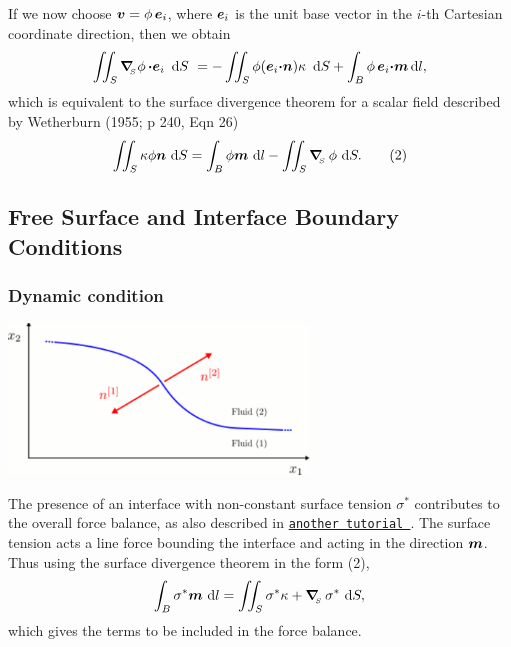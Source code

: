 If we now choose $ \mbox{\boldmath$v$} = \phi\, \mbox{\boldmath$e$}_{i}$, where $ \mbox{\boldmath$e$}_{i}$ is the unit base vector in the $ i\!$-\/th Cartesian coordinate direction, then we obtain \[\int\!\!\!\int_{S} \mbox{\boldmath$\nabla$}_{\!\!_S} \phi\, \mbox{\boldmath$\cdot e$}_{i}\,\mbox{ d}S\ = - \int\!\!\!\int_{S} \phi (\mbox{\boldmath$e$}_{i} \mbox{\boldmath$\cdot n$}) \kappa\,\mbox{ d}S + \int_{B} \phi\, \mbox{\boldmath$e$}_{i} \mbox{\boldmath$\cdot m$}\,\mbox{d} l, \] which is equivalent to the surface divergence theorem for a scalar field described by Wetherburn (1955; p 240, Eqn 26) \[ \int\!\!\!\int_{S} \kappa \phi \mbox{\boldmath$n$}\mbox{ d}S = \int_{B} \phi \mbox{\boldmath$m$} \mbox{ d} l - \int\!\!\!\int_{S}\mbox{\boldmath$\nabla$}_{\!\!_{S}}\, \phi\mbox{ d}S. \quad \quad (2) \]



\hypertarget{index_boundary_conditions}{}\subsection{Free Surface and Interface Boundary Conditions}\label{index_boundary_conditions}
\hypertarget{index_dyn_con}{}\subsubsection{Dynamic condition}\label{index_dyn_con}
 
\begin{DoxyImage}
\includegraphics[width=0.6\textwidth]{free_surface_sketch}
\end{DoxyImage}


The presence of an interface with non-\/constant surface tension $ \sigma^{*} $ contributes to the overall force balance, as also described in \href{../../single_layer_free_surface/html/index.html}{\tt another tutorial }. The surface tension acts a line force bounding the interface and acting in the direction $ \mbox{\boldmath$m$}$. Thus using the surface divergence theorem in the form (2), \[ \int_{B} \sigma^{*} \mbox{\boldmath$m$} \mbox{ d} l = \int\!\!\!\int_{S} \sigma^{*} \kappa + \mbox{\boldmath$\nabla$}_{\!\!_{S}}\, \sigma^{*} \mbox{ d}S, \] which gives the terms to be included in the force balance.


